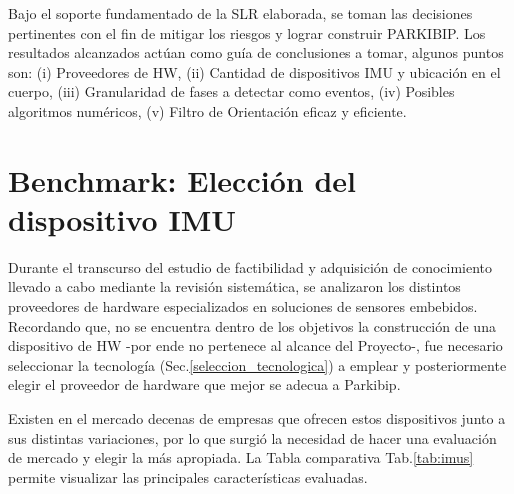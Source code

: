 Bajo el soporte fundamentado de la SLR elaborada, se toman las decisiones pertinentes con el fin de mitigar los riesgos y lograr construir PARKIBIP. Los resultados alcanzados actúan como guía de conclusiones a tomar, algunos puntos son: (i) Proveedores de HW, (ii) Cantidad de dispositivos IMU y ubicación en el cuerpo, (iii) Granularidad de fases a detectar como eventos, (iv) Posibles algoritmos numéricos, (v) Filtro de Orientación eficaz y eficiente.

\section{Benchmark: Elección del dispositivo IMU}\label{section:imu-selection}

Durante el transcurso del estudio de factibilidad y adquisición de conocimiento llevado a cabo mediante la revisión sistemática, se analizaron los distintos proveedores de hardware especializados en soluciones de sensores embebidos. Recordando que, no se encuentra dentro de los objetivos la construcción de una dispositivo de HW -por ende no pertenece al alcance del Proyecto-, fue necesario seleccionar la tecnología (Sec.\ref{seleccion_tecnologica}) a emplear y posteriormente elegir el proveedor de hardware que mejor se adecua a Parkibip.

Existen en el mercado decenas de empresas que ofrecen estos dispositivos junto a sus distintas variaciones, por lo que surgió la necesidad de hacer una evaluación de mercado y elegir la más apropiada. La Tabla comparativa Tab.\ref{tab:imus}  permite visualizar las principales características evaluadas.

